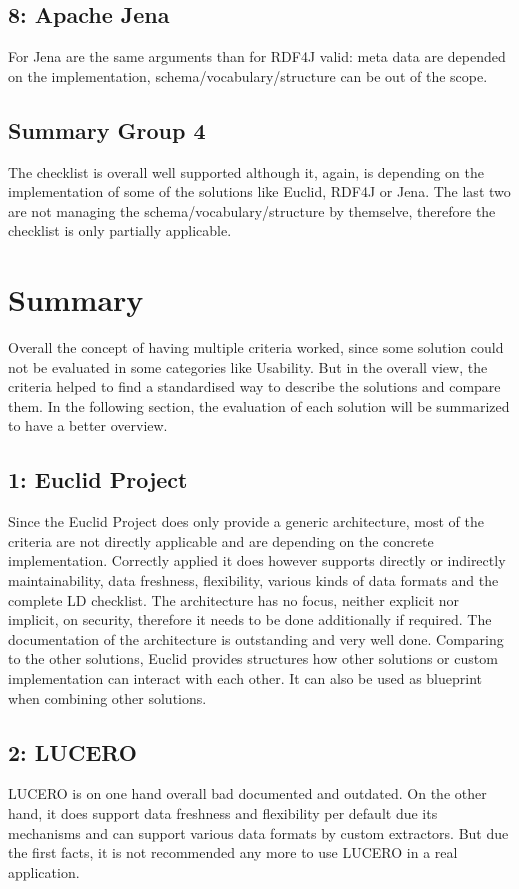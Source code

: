 \subsection*{8: Apache Jena}
For Jena are the same arguments than for RDF4J valid: meta data are depended on the implementation, schema/vocabulary/structure can be out of the scope.

\subsection{Summary Group 4}
The checklist is overall well supported although it, again, is depending on the implementation of some of the solutions like Euclid, RDF4J or Jena. The last two are not managing the schema/vocabulary/structure by themselve, therefore the checklist is only partially applicable.

\section{Summary}\label{comp_summary}

Overall the concept of having multiple criteria worked, since some solution could not be evaluated in some categories like Usability. But in the overall view, the criteria helped to find a standardised way to describe the solutions and compare them. In the following section, the evaluation of each solution will be summarized to have a better overview.

\subsection*{1: Euclid Project}
Since the Euclid Project does only provide a generic architecture, most of the criteria are not directly applicable and are depending on the concrete implementation. Correctly applied it does however supports directly or indirectly maintainability, data freshness, flexibility, various kinds of data formats and the complete LD checklist. The architecture has no focus, neither explicit nor implicit, on security, therefore it needs to be done additionally if required. The documentation of the architecture is outstanding and very well done.
Comparing to the other solutions, Euclid provides structures how other solutions or custom implementation can interact with each other. It can also be used as blueprint when combining other solutions.

\subsection*{2: LUCERO}
LUCERO is on one hand overall bad documented and outdated. On the other hand, it does support data freshness and flexibility per default due its mechanisms and can support various data formats by custom extractors. But due the first facts, it is not recommended any more to use LUCERO in a real application.

